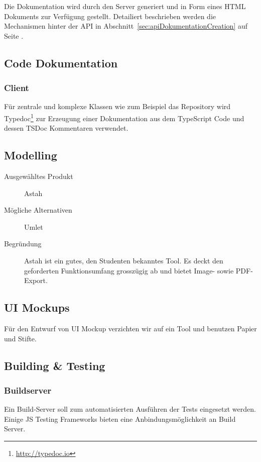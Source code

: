 			Die Dokumentation wird durch den Server generiert und in Form eines HTML Dokuments zur Verfügung gestellt.
			Detailiert beschrieben werden die Mechanismen hinter der API in Abschnitt~\ref{sec:apiDokumentationCreation} auf Seite \pageref{sec:apiDokumentationCreation}.
			
				\subsection{Code Dokumentation}
					\subsubsection{Client}
						Für zentrale und komplexe Klassen wie zum Beispiel das Repository wird Typedoc\footnote{\url{http://typedoc.io}}
						zur Erzeugung einer Dokumentation aus dem TypeScript Code und dessen TSDoc Kommentaren verwendet.


		\subsection{Modelling}
			\begin{description}
				\item[Ausgewähltes Produkt] Astah
				\item[Mögliche Alternativen] Umlet
				\item[Begründung] Astah ist ein gutes, den Studenten bekanntes Tool.
					Es deckt den geforderten Funktionsumfang grosszügig ab und bietet Image- sowie PDF-Export.
			\end{description}

			
		\subsection{UI Mockups}
			Für den Entwurf von UI Mockup verzichten wir auf ein Tool und benutzen Papier und Stifte.


		\subsection{Building \& Testing}
			\subsubsection{Buildserver}
			Ein Build-Server soll zum automatisierten Ausführen der Tests eingesetzt werden.
			Einige JS Testing Frameworks bieten eine Anbindungsmöglichkeit an Build Server.
			
